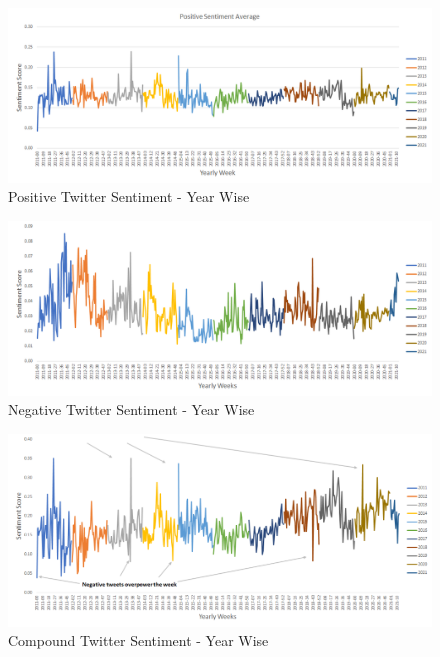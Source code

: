 \documentclass[sigconf, nonacm]{acmart}
\begin{document}
\begin{figure}[H]
  \centering
  \includegraphics[width=\linewidth]{positive_sent_raw.png}
  \caption{Positive Twitter Sentiment - Year Wise}
  \label{positive_sent_raw}
\end{figure}

\begin{figure}[H]
  \centering
  \includegraphics[width=\linewidth]{neg_sent_raw.png}
  \caption{Negative Twitter Sentiment - Year Wise}
  \label{neg_sent_raw}
\end{figure}

\begin{figure}[H]
  \centering
  \includegraphics[width=\linewidth]{comp_sent.png}
  \caption{Compound Twitter Sentiment - Year Wise}
  \label{comp_sent}
\end{figure}
\end{document}
